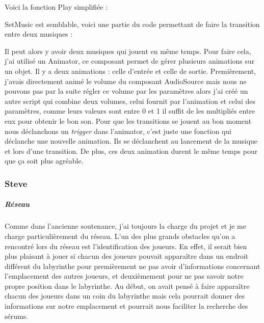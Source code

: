 \documentclass{article}
\begin{document}
Voici la fonction Play simplifiée :

SetMusic est semblable, voici une partie du code permettant de faire la transition entre deux musiques :



Il peut alors y avoir deux musiques qui jouent en même temps. Pour faire cela, j'ai utilisé un Animator, ce composant permet de gérer plusieurs animations sur un objet. Il y a deux animations : celle d'entrée et celle de sortie. Premièrement, j'avais directement animé le volume du composant AudioSource mais nous ne pouvons pas par la suite régler ce volume par les paramètres alors j'ai créé un autre script qui combine deux volumes, celui fournit par l'animation et celui des paramètres, comme leurs valeurs sont entre 0 et 1 il suffit de les multipliés entre eux pour obtenir le bon son. Pour que les transitions se jouent au bon moment nous déclanchons un \emph{trigger} dans l'animator, c'est juste une fonction qui déclanche une nouvelle animation. Ils se déclanchent au lancement de la musique et lors d'une transition. De plus, ces deux animation durent le même temps pour que ça soit plus agréable.


\subsubsection{Steve}

\subparagraph{Réseau}


Comme dans l'ancienne soutenance, j’ai toujours la charge du projet et je me charge particulièrement du réseau. L'un des plus grands obstacles qu'on a rencontré lors du réseau est l'identification des joueurs. En effet, il serait bien plus plaisant à jouer si chacun des joueurs pouvait apparaître dans un endroit différent du labyrinthe pour premièrement ne pas avoir d'informations concernant l'emplacement des autres joueurs, et deuxièmement pour ne pas savoir notre propre position dans le labyrinthe. Au début, on avait pensé à faire apparaître chacun des joueurs dans un coin du labyrinthe mais cela pourrait donner des informations sur notre emplacement et pourrait nous faciliter la recherche des sérums.
\end{document}
